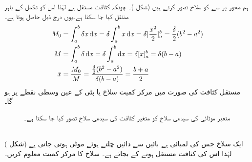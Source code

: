 ہم محور  پر  سے   کو سلاخ تصور کرتے ہیں (شکل )۔ چونکہ کثافت مستقل ہے لہٰذا اس کو تکمل کے باہر منتقل کیا جا سکتا ہے۔یوں درج ذیل حاصل ہوتا ہے۔
\begin{align*}
M_0&=\int_a^b\delta x\dif x=\delta \int_a^bx\dif x=\delta[\frac{x^2}{2}]_a^b=\frac{\delta}{2}(b^2-a^2)\\
M&=\int_a^b\delta \dif x=\delta\int_a^b\dif x=\delta[x]_a^b=\delta(b-a)\\
\bar{x}&=\frac{M_0}{M}=\frac{\frac{\delta}{2}(b^2-a^2)}{\delta (b-a)}=\frac{b+a}{2}
\end{align*}
مستقل کثافت کی صورت میں مرکز کمیت سلاخ یا پٹی کے عین وسطی نقطے  پر ہو گا۔
\begin{figure}
\centering
\begin{minipage}{0.45\textwidth}
\centering
{}
\caption{مستقل کثافت کی پتلی سیدھی سلاخ کا مرکز کمیت دونوں سروں کے وسطی نقطے پر ہو گا۔}
\label{شکل_تکمل_استعمال_پتلا_سلاخ}
\end{minipage}\hfill
\begin{minipage}{0.45\textwidth}
\centering
{}
\caption{متغیر موٹائی کی  سیدھی سلاخ کو متغیر کثافت کی سیدھی سلاخ تصور کیا جا سکتا ہے۔}
\label{شکل_تکمل_استعمال_متغیر_پتلا_سلاخ}
\end{minipage}
\end{figure}
\\
ایک سلاخ جس کی لمبائی  ہے بائیں سے دائیں چلتے ہوئے موٹی  ہوتی جاتی ہے (شکل ) لہٰذا اس کی کثافت مستقل ہونے کے بجائے  ہے۔ سلاخ کا مرکز کمیت معلوم کریں۔

